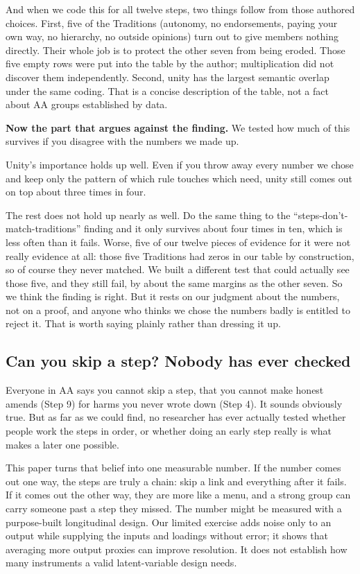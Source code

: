 \documentclass[11pt,a4paper]{article}
\begin{document}
And when we code this for all twelve steps, two things follow from those authored
choices. First, five of the
Traditions (autonomy, no endorsements, paying your own way, no hierarchy, no
outside opinions) turn out to give members nothing directly. Their whole job is to
protect the other seven from being eroded. Those five empty rows were put into the
table by the author; multiplication did not discover them independently. Second,
unity has the largest semantic overlap under the same coding. That is a concise
description of the table, not a fact about AA groups established by data.

\textbf{Now the part that argues against the finding.} We tested how much of this
survives if you disagree with the numbers we made up.

Unity's importance holds up well. Even if you throw away every number we chose and
keep only the pattern of which rule touches which need, unity still comes out on
top about three times in four.

The rest does not hold up nearly as well. Do the same thing to the
``steps-don't-match-traditions'' finding and it only survives about four times in
ten, which is less often than it fails. Worse, five of our twelve pieces of
evidence for it were not really evidence at all: those five Traditions had zeros
in our table by construction, so of course they never matched. We built a
different test that could actually see those five, and they still fail, by about
the same margins as the other seven. So we think the finding is right. But it
rests on our judgment about the numbers, not on a proof, and anyone who thinks we
chose the numbers badly is entitled to reject it. That is worth saying plainly
rather than dressing it up.

\subsection{Can you skip a step? Nobody has ever checked}

Everyone in AA says you cannot skip a step, that you cannot make honest amends
(Step 9) for harms you never wrote down (Step 4). It sounds obviously true. But as
far as we could find, no researcher has ever actually tested whether people work
the steps in order, or whether doing an early step really is what makes a later
one possible.

This paper turns that belief into one measurable number. If the number comes out
one way, the steps are truly a chain: skip a link and everything after it fails.
If it comes out the other way, they are more like a menu, and a strong group can
carry someone past a step they missed. The number might be measured with a
purpose-built longitudinal design. Our limited exercise adds noise only to an
output while supplying the inputs and loadings without error; it shows that
averaging more output proxies can improve resolution. It does not establish how
many instruments a valid latent-variable design needs.
\end{document}
